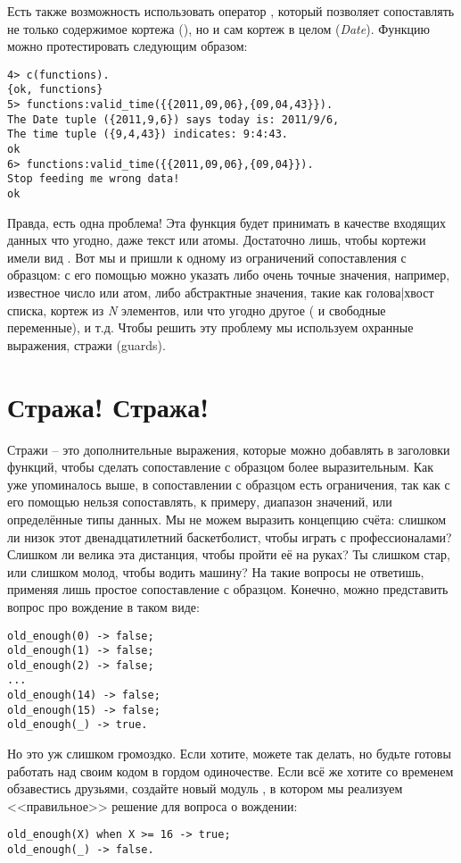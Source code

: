 Есть также возможность использовать оператор \ops{\strut=}, который позволяет сопоставлять не только содержимое кортежа (), но и сам кортеж в целом (\emph{Date}).
Функцию можно протестировать следующим образом:
\begin{lstlisting}[style=erlang]
4> c(functions).
{ok, functions}
5> functions:valid_time({{2011,09,06},{09,04,43}}).
The Date tuple ({2011,9,6}) says today is: 2011/9/6,
The time tuple ({9,4,43}) indicates: 9:4:43.
ok
6> functions:valid_time({{2011,09,06},{09,04}}).
Stop feeding me wrong data!
ok
\end{lstlisting}

Правда, есть одна проблема!
Эта функция будет принимать в качестве входящих данных что угодно, даже текст или атомы.
Достаточно лишь, чтобы кортежи имели вид .
Вот мы и пришли к одному из ограничений сопоставления с образцом: с его помощью можно указать либо очень точные значения, например, известное число или атом, либо абстрактные значения, такие как голова|хвост списка, кортеж из \emph{N} элементов, или что угодно другое (\ops{\strut\_} и свободные переменные), и т.д.
Чтобы решить эту проблему мы используем охранные выражения, стражи (guards). 
\section{Стража! Стража!}
Стражи \--- это дополнительные выражения, которые можно добавлять в заголовки функций, чтобы сделать сопоставление с образцом более выразительным.
Как уже упоминалось выше, в сопоставлении с образцом есть ограничения, так как с его помощью нельзя сопоставлять, к примеру, диапазон значений, или  определённые типы данных.
Мы не можем выразить концепцию счёта: слишком ли низок этот двенадцатилетний баскетболист, чтобы играть с профессионалами?
Слишком ли велика эта дистанция, чтобы пройти её на руках?
Ты слишком стар, или слишком молод, чтобы водить машину?
На такие вопросы не ответишь, применяя лишь простое сопоставление с образцом.
Конечно, можно представить вопрос про вождение в таком виде:
\begin{lstlisting}[style=erlang]
old_enough(0) -> false;
old_enough(1) -> false;
old_enough(2) -> false;
...
old_enough(14) -> false;
old_enough(15) -> false;
old_enough(_) -> true.
\end{lstlisting}

Но это уж слишком громоздко.
Если хотите, можете так делать, но будьте готовы работать над своим кодом в гордом одиночестве.
Если всё же хотите со временем обзавестись друзьями, создайте новый модуль , в котором мы реализуем <<правильное>> решение для вопроса о вождении:
\begin{lstlisting}[style=erlang]
old_enough(X) when X >= 16 -> true;
old_enough(_) -> false.
\end{lstlisting}


